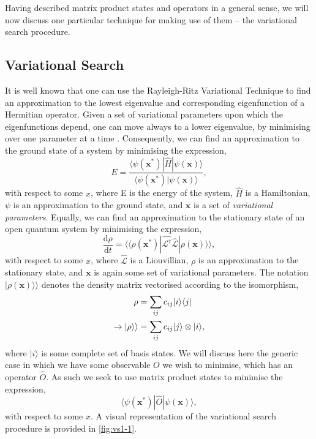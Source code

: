  Having described matrix product states and operators in a general sense, we will now discuss one particular technique for making use of them -- the variational search procedure.
 
 \subsection{Variational Search}
 It is well known that one can use the Rayleigh-Ritz Variational Technique to find an approximation to the lowest eigenvalue and corresponding eigenfunction of a Hermitian operator. Given a set of variational parameters upon which the eigenfunctions depend, one can move always to a lower eigenvalue, by minimising over one parameter at a time \cite{ArfWeb_RRVT, Gasiorowicz_RVT}. Consequently, we can find an approximation to the ground state of a system by minimising the expression,
\begin{equation}
E = \frac{\langle \psi (\mathbf{x}^{*}) | \hat{H} | \psi (\mathbf{x}) \rangle}{\langle \psi (\mathbf{x}^{*}) | \psi (\mathbf{x}) \rangle},
\label{eq:vs1-1}
\end{equation}
with respect to some \(x\), where E is the energy of the system, \(\hat{H}\) is a Hamiltonian, \(\psi\) is an approximation to the ground state, and \( \mathbf{x} \) is a set of \emph{variational parameters}. Equally, we can find an approximation to the stationary state of an open quantum system by minimising the expression,
\begin{equation}
\frac{\mathrm{d}\rho}{\mathrm{d}t} = \langle \langle \rho(\mathbf{x}^{*}) | \hat{\mathcal{L}^{\dagger}} \hat{\mathcal{L}} | \rho(\mathbf{x}) \rangle \rangle,
\label{eq:vs1-2}
\end{equation}
with respect to some \(x\), where \(\hat{\mathcal{L}}\) is a Liouvillian, \(\rho\) is an approximation to the stationary state, and \(\mathbf{x}\) is again some set of variational parameters. The notation \(|\rho (\mathbf{x}) \rangle \rangle\) denotes the density matrix vectorised according to the isomorphism,
\begin{align}
\rho &= \sum_{ij} c_{ij} |i \rangle \langle j| \notag \\
\rightarrow | \rho \rangle \rangle &= \sum_{ij} c_{ij} |j \rangle \otimes |i \rangle,
\label{eq:vs1-11}
\end{align}
where \(|i\rangle\) is some complete set of basis states. We will discuss here the generic case in which we have some observable \(O\) we wish to minimise, which has an operator \(\hat{O}\). As such we seek to use matrix product states to minimise the expression,
\begin{equation}
\langle \psi(\mathbf{x}^{*}) | \hat{O} | \psi(\mathbf{x}) \rangle,
\label{eq:vs1-10}
\end{equation}
with respect to some \(x\). A visual representation of the variational search procedure is provided in \cref{fig:vs1-1}.

